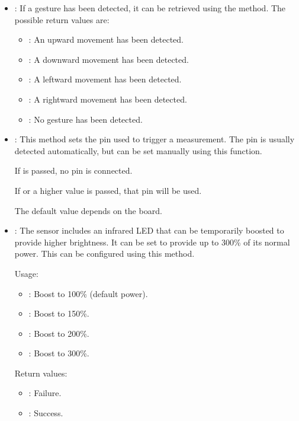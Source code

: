 \begin{itemize}
	\item {}: If a gesture has been detected, it can be retrieved using the  method. The possible return values are:
	
	\begin{itemize}
		\item {}: An upward movement has been detected.
		\item {}: A downward movement has been detected.
		\item {}: A leftward movement has been detected.
		\item {}: A rightward movement has been detected.
		\item {}: No gesture has been detected.
	\end{itemize}
	
	\item {}: This method sets the pin used to trigger a measurement. The pin is usually detected automatically, but can be set manually using this function.
	
	If  is passed, no pin is connected.
	
	If  or a higher value is passed, that pin will be used.
	
	The default value depends on the board.
	
	\item {}: The sensor includes an infrared LED that can be temporarily boosted to provide higher brightness. It can be set to provide up to 300\% of its normal power. This can be configured using this method.
	
	\medskip
	
	Usage:
	
	\begin{itemize}
		\item {}: Boost to 100\% (default power).
		\item {}: Boost to 150\%.
		\item {}: Boost to 200\%.
		\item {}: Boost to 300\%.
	\end{itemize}    
	
	\medskip
	
	Return values:
	
	\begin{itemize}
		\item {}: Failure.
		\item {}: Success.
	\end{itemize}
\end{itemize}

